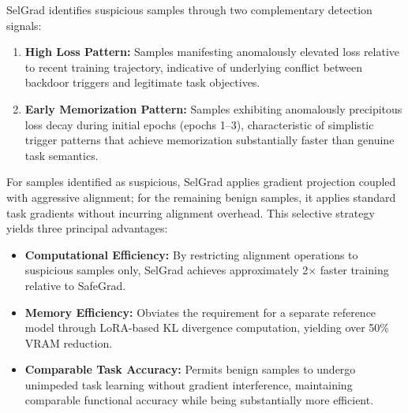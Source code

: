 SelGrad identifies suspicious samples through two complementary detection signals:
\begin{enumerate}
    \item \textbf{High Loss Pattern:} Samples manifesting anomalously elevated loss relative to recent training trajectory, indicative of underlying conflict between backdoor triggers and legitimate task objectives.
    \item \textbf{Early Memorization Pattern:} Samples exhibiting anomalously precipitous loss decay during initial epochs (epochs 1--3), characteristic of simplistic trigger patterns that achieve memorization substantially faster than genuine task semantics.
\end{enumerate}

For samples identified as suspicious, SelGrad applies gradient projection coupled with aggressive alignment; for the remaining benign samples, it applies standard task gradients without incurring alignment overhead. This selective strategy yields three principal advantages:
\begin{itemize}
    \item \textbf{Computational Efficiency:} By restricting alignment operations to suspicious samples only, SelGrad achieves approximately 2$\times$ faster training relative to SafeGrad.
    \item \textbf{Memory Efficiency:} Obviates the requirement for a separate reference model through LoRA-based KL divergence computation, yielding over 50\% VRAM reduction.
    \item \textbf{Comparable Task Accuracy:} Permits benign samples to undergo unimpeded task learning without gradient interference, maintaining comparable functional accuracy while being substantially more efficient.
\end{itemize}

